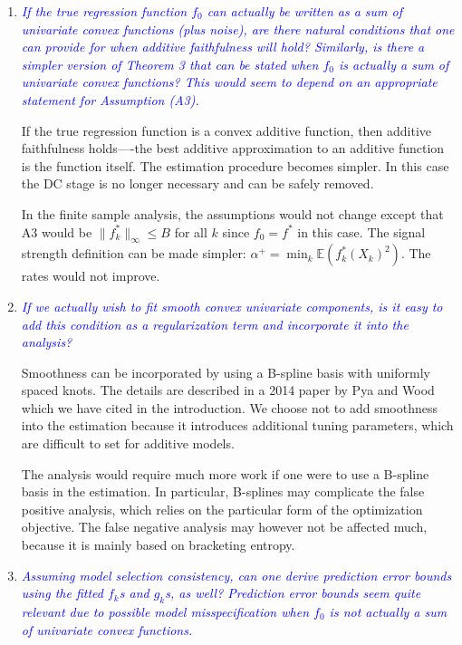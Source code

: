 \documentclass[pdftex,12pt]{article}
\def\rc#1{{\it\textcolor{blue}{#1}}\smallskip}
\begin{document}
\begin{enumerate}[(1)]
\item \rc{If the true regression function $f_0$ can actually be written as a
sum of univariate convex functions (plus noise), are there natural
conditions that one can provide for when additive faithfulness will
hold? Similarly, is there a simpler version of Theorem 3 that can be
stated when $f_0$ is actually a sum of univariate convex functions? This
would seem to depend on an appropriate statement for Assumption (A3).}

If the true regression function is a convex additive function, then
additive faithfulness holds----the best additive approximation
to an additive function is the function itself. The estimation
procedure becomes simpler.  In this case the DC stage is no longer necessary and can
be safely removed.

In the finite sample analysis, the assumptions would not change except that A3 would be $\| f^*_k \|_\infty \leq B$ for all $k$ since $f_0 = f^*$ in this case. The signal strength definition can be made simpler: $\alpha^+ = \min_k \mathbb{E}( f^*_k(X_k)^2 )$. The rates would not improve.


\item \rc{If we actually wish to fit smooth convex univariate components, is
it easy to add this condition as a regularization term and incorporate
it into the analysis?}

Smoothness can be incorporated by using a B-spline basis with uniformly
spaced knots. The details are described in a 2014 paper by Pya and
Wood which we have cited in the introduction. We choose not to add
smoothness into the estimation because it introduces 
additional tuning parameters, which are difficult to set for
additive models.

The analysis would require much more work if one were to use a B-spline basis
in the estimation. In particular, B-splines may complicate the false positive
analysis, which relies on the particular form of the optimization
objective. The false negative analysis may however not be affected much,
because it is mainly based on bracketing entropy.

\item \rc{Assuming model selection consistency, can one derive prediction
error bounds using the fitted $f_k$s and $g_k$s, as well? Prediction error
bounds seem quite relevant due to possible model misspecification when
$f_0$ is not actually a sum of univariate convex functions.}


\end{enumerate}
\end{document}
